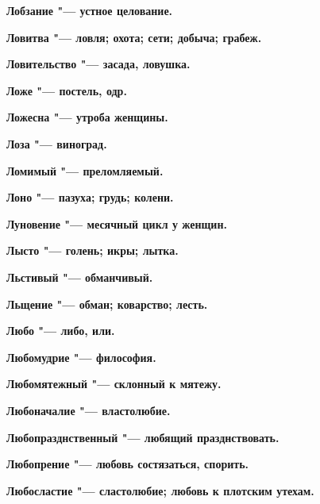 \bfseries Лобзание \normalfont{} "--- устное целование. 




\bfseries Ловитва \normalfont{} "--- ловля; охота; сети; добыча; грабеж. 




\bfseries Ловительство \normalfont{} "--- засада, ловушка. 




\bfseries Ложе \normalfont{} "--- постель, одр. 




\bfseries Ложесна \normalfont{} "--- утроба женщины. 




\bfseries Лоза \normalfont{} "--- виноград. 




\bfseries Ломимый \normalfont{} "--- преломляемый. 




\bfseries Лоно \normalfont{} "--- пазуха; грудь; колени. 




\bfseries Луновение \normalfont{} "--- месячный цикл у женщин. 




\bfseries Лысто \normalfont{} "--- голень; икры; лытка. 




\bfseries Льстивый \normalfont{} "--- обманчивый. 




\bfseries Льщение \normalfont{} "--- обман; коварство; лесть. 




\bfseries Любо \normalfont{} "--- либо, или. 




\bfseries Любомудрие \normalfont{} "--- философия. 




\bfseries Любомятежный \normalfont{} "--- склонный к мятежу. 




\bfseries Любоначалие \normalfont{} "--- властолюбие. 




\bfseries Любопразднственный \normalfont{} "--- любящий празднствовать. 




\bfseries Любопрение \normalfont{} "--- любовь состязаться, спорить. 




\bfseries Любосластие \normalfont{} "--- сластолюбие; любовь к плотским утехам. 




